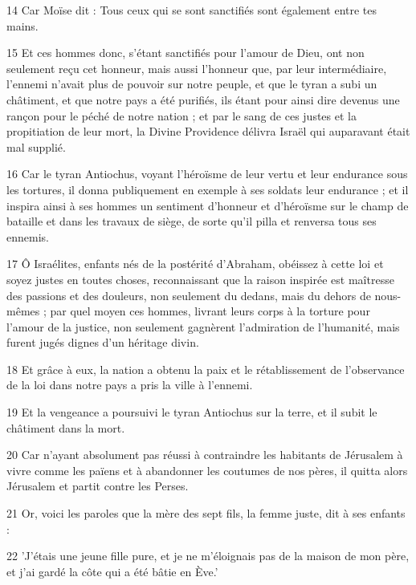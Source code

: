 \par 14 Car Moïse dit : Tous ceux qui se sont sanctifiés sont également entre tes mains.

\par 15 Et ces hommes donc, s'étant sanctifiés pour l'amour de Dieu, ont non seulement reçu cet honneur, mais aussi l'honneur que, par leur intermédiaire, l'ennemi n'avait plus de pouvoir sur notre peuple, et que le tyran a subi un châtiment, et que notre pays a été purifiés, ils étant pour ainsi dire devenus une rançon pour le péché de notre nation ; et par le sang de ces justes et la propitiation de leur mort, la Divine Providence délivra Israël qui auparavant était mal supplié.

\par 16 Car le tyran Antiochus, voyant l'héroïsme de leur vertu et leur endurance sous les tortures, il donna publiquement en exemple à ses soldats leur endurance ; et il inspira ainsi à ses hommes un sentiment d'honneur et d'héroïsme sur le champ de bataille et dans les travaux de siège, de sorte qu'il pilla et renversa tous ses ennemis.

\par 17 Ô Israélites, enfants nés de la postérité d'Abraham, obéissez à cette loi et soyez justes en toutes choses, reconnaissant que la raison inspirée est maîtresse des passions et des douleurs, non seulement du dedans, mais du dehors de nous-mêmes ; par quel moyen ces hommes, livrant leurs corps à la torture pour l'amour de la justice, non seulement gagnèrent l'admiration de l'humanité, mais furent jugés dignes d'un héritage divin.

\par 18 Et grâce à eux, la nation a obtenu la paix et le rétablissement de l'observance de la loi dans notre pays a pris la ville à l'ennemi.

\par 19 Et la vengeance a poursuivi le tyran Antiochus sur la terre, et il subit le châtiment dans la mort.

\par 20 Car n'ayant absolument pas réussi à contraindre les habitants de Jérusalem à vivre comme les païens et à abandonner les coutumes de nos pères, il quitta alors Jérusalem et partit contre les Perses.

\par 21 Or, voici les paroles que la mère des sept fils, la femme juste, dit à ses enfants :

\par 22 'J'étais une jeune fille pure, et je ne m'éloignais pas de la maison de mon père, et j'ai gardé la côte qui a été bâtie en Ève.'

